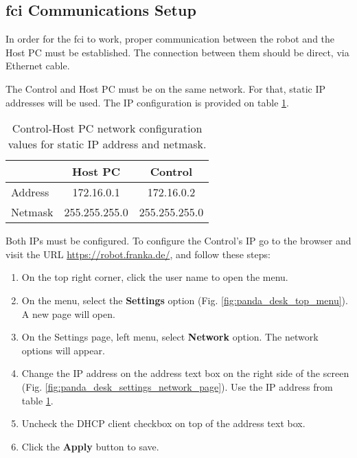 

\subsection{\gls{fci} Communications Setup}
\label{subsec:ros_setup_robotic_system_integration_ros_comms_setup}

In order for the \gls{fci} to work, proper communication between the robot and the Host PC must be established. The connection between them should be direct, via Ethernet cable.

The Control and Host PC must be on the same network. For that, static IP addresses will be used. The IP configuration is provided on table \ref{tab:communicaton_setup_ips}.

\begin{table}[htbp]
    \caption[Control-Host PC network configuration values for static IP address and netmask.]{Control-Host PC network configuration values for static IP address and netmask.}
    \centering
    \begin{tabular}{l|c|c}
        \toprule
         & Host PC & Control \\
        \midrule 
         Address & 172.16.0.1 & 172.16.0.2 \\ 
         Netmask & 255.255.255.0 & 255.255.255.0 \\
         \bottomrule
    \end{tabular}
    \label{tab:communicaton_setup_ips}
\end{table}

Both IPs must be configured. To configure the Control's IP go to the browser and visit the URL \url{https://robot.franka.de/}, and follow these steps:

\begin{enumerate}
    \item On the top right corner, click the user name to open the menu.
    \item On the menu, select the \textbf{Settings} option (Fig. \ref{fig:panda_desk_top_menu}). A new page will open.
    \item On the Settings page, left menu, select \textbf{Network} option. The network options will appear.
    \item Change the IP address on the address text box on the right side of the screen (Fig. \ref{fig:panda_desk_settings_network_page}). Use the IP address from table \ref{tab:communicaton_setup_ips}.
    \item Uncheck the DHCP client checkbox on top of the address text box.
    \item Click the \textbf{Apply} button to save.
\end{enumerate}

